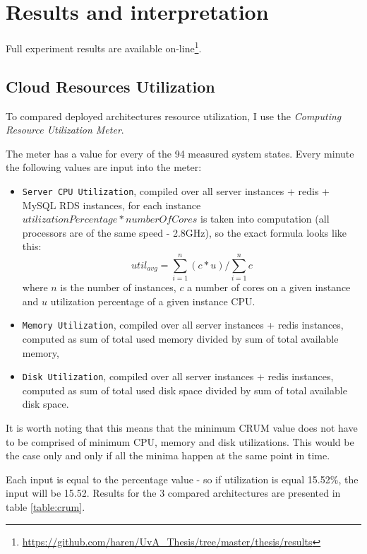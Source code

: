 \documentclass{uvamscse}
\begin{document}
\section{Results and interpretation}

Full experiment results are available on-line\footnote{\url{https://github.com/haren/UvA_Thesis/tree/master/thesis/results}}.

\subsection{Cloud Resources Utilization}
To compared deployed architectures resource utilization, I use the \textit{Computing Resource Utilization Meter}.

The meter has a value for every of the 94 measured system states. Every minute the following values are input into the meter:
\begin{itemize}
  \item \texttt{Server CPU Utilization}, compiled over all server instances + redis + MySQL RDS instances, for each instance $utilizationPercentage * numberOfCores$ is taken into computation (all processors are of the same speed - 2.8GHz), so the exact formula looks like this: $$util_{avg} = \sum_{i=1}^{n}(c*u) / \sum_{i=1}^{n}c$$ where $n$ is the number of instances, $c$ a number of cores on a given instance and $u$ utilization percentage of a given instance CPU.
  \item \texttt{Memory Utilization}, compiled over all server instances + redis instances, computed as sum of total used memory divided by sum of total available memory,
  \item \texttt{Disk Utilization}, compiled over all server instances + redis instances, computed as sum of total used disk space divided by sum of total available disk space.
\end{itemize}

It is worth noting that this means that the minimum CRUM value does not have to be comprised of minimum CPU, memory and disk utilizations. This would be the case only and only if all the minima happen at the same point in time.

Each input is equal to the percentage value - so if utilization is equal 15.52\%, the input will be 15.52. Results for the 3 compared architectures are presented in table \ref{table:crum}.
\end{document}
